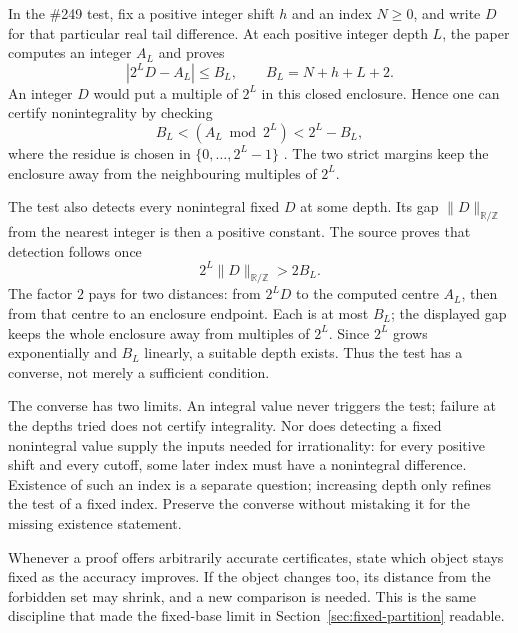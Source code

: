 In the \#249 test, fix a positive integer shift $h$ and an index $N\ge0$,
and write $D$ for that particular real tail difference. At each positive integer
depth $L$, the paper computes an integer $A_L$ and proves
\[
       |2^LD-A_L|\le B_L,\qquad B_L=N+h+L+2.
\]
An integer $D$ would put a multiple of $2^L$ in this closed enclosure. Hence
one can certify nonintegrality by checking
\[
       B_L<(A_L\bmod 2^L)<2^L-B_L,
\]
where the residue is chosen in $\{0,\ldots,2^L-1\}$
\cite[section on binary totient tails]{paper249}. The two strict margins
keep the enclosure away from the neighbouring multiples of $2^L$.

The test also detects every nonintegral fixed $D$ at some depth. Its gap
$\|D\|_{\mathbb R/\mathbb Z}$ from the nearest integer is then a positive
constant. The source proves that detection follows once
\[
                 2^L\|D\|_{\mathbb R/\mathbb Z}>2B_L.
\]
The factor $2$ pays for two distances: from $2^LD$ to the computed centre
$A_L$, then from that centre to an enclosure endpoint. Each is at most $B_L$;
the displayed gap keeps the whole enclosure away from multiples of $2^L$.
Since $2^L$ grows exponentially and $B_L$ linearly, a suitable depth exists.
Thus the test has a converse, not merely a sufficient condition.

The converse has two limits. An integral value never triggers the test;
failure at the depths tried does not certify integrality. Nor does detecting
a fixed nonintegral value supply the inputs needed for irrationality: for
every positive shift and every cutoff, some later index must have a nonintegral
difference. Existence of such an index is a separate question; increasing depth
only refines the test of a fixed index. Preserve the converse without mistaking
it for the missing existence statement.

Whenever a proof offers arbitrarily accurate certificates, state which object
stays fixed as the accuracy improves. If the object changes too, its distance
from the forbidden set may shrink, and a new comparison is needed. This is the
same discipline that made the fixed-base limit in
Section~\ref{sec:fixed-partition} readable.
